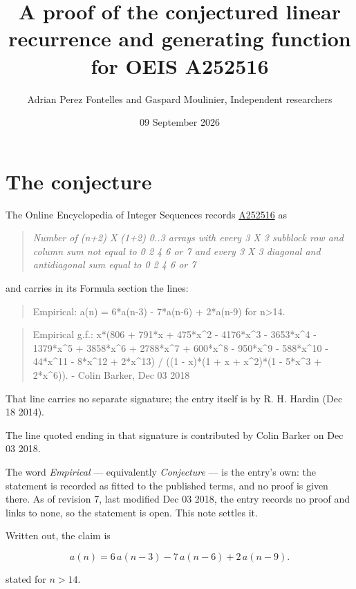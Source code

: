 \documentclass[11pt]{article}
\title{A proof of the conjectured linear recurrence and generating function for OEIS A252516}
\author{Adrian Perez Fontelles and Gaspard Moulinier, Independent researchers}
\date{09 September 2026}
\theoremstyle{definition}
\begin{document}
\maketitle
\section{The conjecture}

The Online Encyclopedia of Integer Sequences records \href{https://oeis.org/A252516}{A252516} as

\begin{quote}\itshape Number of (n+2) X (1+2) 0..3 arrays with every 3 X 3 subblock row and column sum not equal to 0 2 4 6 or 7 and every 3 X 3 diagonal and antidiagonal sum equal to 0 2 4 6 or 7\end{quote}

and carries in its Formula section the lines:

\begin{quote}\ttfamily Empirical: a(n) = 6*a(n-3) - 7*a(n-6) + 2*a(n-9) for n>14.\end{quote}

\begin{quote}\ttfamily Empirical g.f.: x*(806 + 791*x + 475*x\textasciicircum{}2 - 4176*x\textasciicircum{}3 - 3653*x\textasciicircum{}4 - 1379*x\textasciicircum{}5 + 3858*x\textasciicircum{}6 + 2788*x\textasciicircum{}7 + 600*x\textasciicircum{}8 - 950*x\textasciicircum{}9 - 588*x\textasciicircum{}10 - 44*x\textasciicircum{}11 - 8*x\textasciicircum{}12 + 2*x\textasciicircum{}13) / ((1 - x)*(1 + x + x\textasciicircum{}2)*(1 - 5*x\textasciicircum{}3 + 2*x\textasciicircum{}6)). - Colin Barker, Dec 03 2018\end{quote}

That line carries no separate signature; the entry itself is by R. H. Hardin (Dec 18 2014).

The line quoted ending in that signature is contributed by Colin Barker on Dec 03 2018.

The word {\itshape Empirical} --- equivalently {\itshape Conjecture} --- is the entry's own: the statement is recorded as fitted to the published terms, and no proof is given there. As of revision 7, last modified Dec 03 2018, the entry records no proof and links to none, so the statement is open. This note settles it.

Written out, the claim is

\[a(n) = 6\,a(n-3) - 7\,a(n-6) + 2\,a(n-9).\]

stated for $n > 14$.
\end{document}
